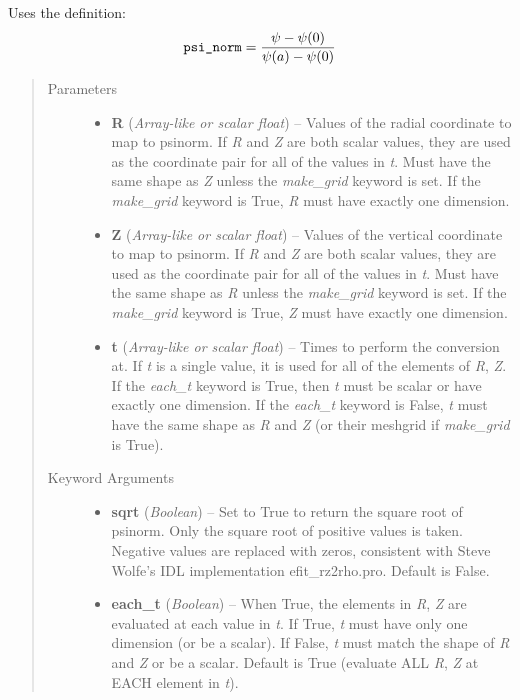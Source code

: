 \documentclass[letterpaper,10pt,english]{sphinxmanual}
\begin{document}
\begin{fulllineitems}
\begin{fulllineitems}
Uses the definition:
\begin{gather}
\begin{split}\texttt{psi\_norm} = \frac{\psi - \psi(0)}{\psi(a) - \psi(0)}\end{split}\notag
\end{gather}\begin{quote}\begin{description}
\item[{Parameters}] \leavevmode\begin{itemize}
\item {} 
\textbf{R} (\emph{Array-like or scalar float}) --
Values of the radial coordinate to
map to psinorm. If \emph{R} and \emph{Z} are both scalar values,
they are used as the coordinate pair for all of the values in
\emph{t}. Must have the same shape as \emph{Z} unless the \emph{make\_grid}
keyword is set. If the \emph{make\_grid} keyword is True, \emph{R} must
have exactly one dimension.

\item {} 
\textbf{Z} (\emph{Array-like or scalar float}) --
Values of the vertical coordinate to
map to psinorm. If \emph{R} and \emph{Z} are both scalar values,
they are used as the coordinate pair for all of the values in
\emph{t}. Must have the same shape as \emph{R} unless the \emph{make\_grid}
keyword is set. If the \emph{make\_grid} keyword is True, \emph{Z} must
have exactly one dimension.

\item {} 
\textbf{t} (\emph{Array-like or scalar float}) --
Times to perform the conversion at.
If \emph{t} is a single value, it is used for all of the elements of
\emph{R}, \emph{Z}. If the \emph{each\_t} keyword is True, then \emph{t} must be
scalar or have exactly one dimension. If the \emph{each\_t} keyword is
False, \emph{t} must have the same shape as \emph{R} and \emph{Z} (or their
meshgrid if \emph{make\_grid} is True).

\end{itemize}

\item[{Keyword Arguments}] \leavevmode\begin{itemize}
\item {} 
\textbf{sqrt} (\emph{Boolean}) --
Set to True to return the square root of psinorm.
Only the square root of positive values is taken. Negative
values are replaced with zeros, consistent with Steve Wolfe's
IDL implementation efit\_rz2rho.pro. Default is False.

\item {} 
\textbf{each\_t} (\emph{Boolean}) --
When True, the elements in \emph{R}, \emph{Z} are evaluated
at each value in \emph{t}. If True, \emph{t} must have only one dimension
(or be a scalar). If False, \emph{t} must match the shape of \emph{R} and
\emph{Z} or be a scalar. Default is True (evaluate ALL \emph{R}, \emph{Z} at
EACH element in \emph{t}).


\end{itemize}
\end{description}
\end{quote}
\end{fulllineitems}
\end{fulllineitems}
\end{document}
